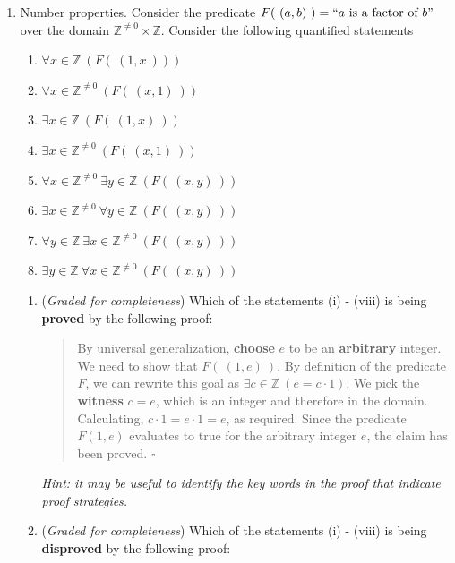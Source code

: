 \documentclass[12pt, oneside]{article}
\newcommand{\gradeComplete}{({\it Graded for completeness}) }
\begin{document}
\begin{enumerate}[labelindent=0pt, leftmargin=0pt]
    
    \item Number properties. Consider the predicate  $F(~(a,b)~)  = ``a \text{ is a factor of } b"$ 
    over  the domain $\mathbb{Z}^{\neq 0} \times \mathbb{Z}$. Consider the following quantified
    statements
    \begin{multicols}{2}
    \begin{enumerate}[label=(\roman*)]
    \item $\forall x \in \mathbb{Z} ~(F(~(1,x~)))$
    \item $\forall x \in \mathbb{Z}^{\neq 0} ~(F(~(x,1)~))$
    \item $\exists x \in \mathbb{Z} ~(F(~(1,x)~))$
    \item $\exists x \in \mathbb{Z}^{\neq 0} ~(F(~(x,1)~))$
    \item $\forall x \in \mathbb{Z}^{\neq 0} ~\exists y \in \mathbb{Z} ~(F(~(x,y)~))$
    \item $\exists x \in \mathbb{Z}^{\neq 0} ~\forall y \in \mathbb{Z} ~(F(~(x,y)~))$
    \item $\forall y \in \mathbb{Z} ~\exists x \in \mathbb{Z}^{\neq 0} ~(F(~(x,y)~))$
    \item $\exists y \in \mathbb{Z} ~\forall x \in \mathbb{Z}^{\neq 0} ~(F(~(x,y)~))$
    \end{enumerate}
    \end{multicols}
    
    \begin{enumerate}
    
    \item\gradeComplete
    Which of the statements (i) - (viii) is being {\bf proved} by the following proof:
    
    \begin{quote}
      By universal generalization, {\bf choose} $e$ to be an {\bf arbitrary} integer. 
      We need to show that $F(~(1,e)~)$. By definition of the  predicate $F$, we can rewrite 
      this goal as $\exists c \in \mathbb{Z}~(e = c \cdot 1)$. We pick the {\bf witness} $c = e$, 
      which is an integer and therefore in the domain. Calculating, 
      $c \cdot 1 = e \cdot 1 = e$, as required. Since the predicate $F(1,e)$ evaluates to true 
      for the arbitrary integer $e$, the claim has been proved. $\square$
    \end{quote}
    
    
    {\it Hint: it may be useful to 
    identify the key words in the proof that indicate proof strategies.}
    
    \item\gradeComplete
    Which of the statements (i) - (viii) is being {\bf disproved} by the following proof:
    

\end{enumerate}
\end{enumerate}
\end{document}
